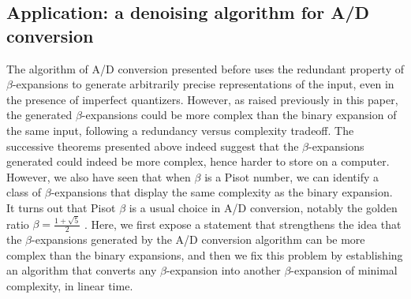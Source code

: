 	


	\subsection{Application: a denoising algorithm for A/D conversion}

	The algorithm of A/D conversion presented before uses the redundant property of $\beta$-expansions to generate arbitrarily precise representations of the input, even in the presence of imperfect quantizers. However, as raised previously in this paper, the generated $\beta$-expansions could be more complex than the binary expansion of the same input, following a redundancy versus complexity tradeoff. The successive theorems presented above indeed suggest that the $\beta$-expansions generated could indeed be more complex, hence harder to store on a computer. However, we also have seen that when $\beta$ is a Pisot number, we can identify a class of $\beta$-expansions that display the same complexity as the binary expansion. It turns out that Pisot $\beta$ is a usual choice in A/D conversion, notably the golden ratio $\beta = \frac{1+\sqrt{5}}{2}$ \cite{daubechies2010GoldenRatioEncoder}. Here, we first expose a statement that strengthens the idea that the $\beta$-expansions generated by the A/D conversion algorithm can be more complex than the binary expansions, and then we fix this problem by establishing an algorithm that converts any $\beta$-expansion into another $\beta$-expansion of minimal complexity, in linear time.

